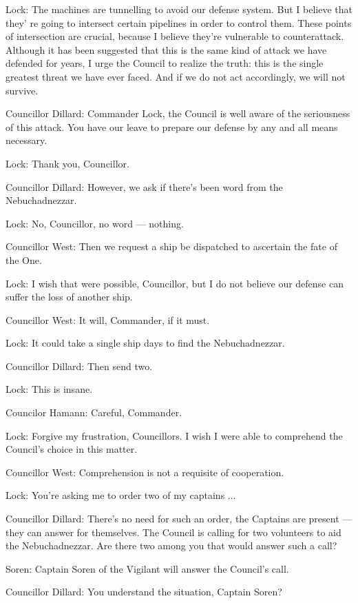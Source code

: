 \documentclass{ctexart}
\newenvironment{myquote}{\color{green} \setlength{\leftskip}{6em} \setlength{\rightskip}{4em} \setlength{\parindent}{-2em}}{\par}
\begin{document}
\begin{myquote}
Lock: The machines are tunnelling to avoid our defense system. But I believe that they' re going to intersect certain pipelines in order to control them. These points of intersection are crucial, because I believe they're vulnerable to counterattack. Although it has been suggested that this is the same kind of attack we have defended for years, I urge the Council to realize the truth: this is the single greatest threat we have ever faced. And if we do not act accordingly, we will not survive.

Councillor Dillard: Commander Lock, the Council is well aware of the seriousness of this attack. You have our leave to prepare our defense by any and all means necessary.

Lock: Thank you, Councillor.

Councillor Dillard: However, we ask if there's been word from the Nebuchadnezzar.

Lock: No, Councillor, no word --- nothing.

Councillor West: Then we request a ship be dispatched to ascertain the fate of the One.

Lock: I wish that were possible, Councillor, but I do not believe our defense can suffer the loss of another ship.

Councillor West: It will, Commander, if it must.

Lock: It could take a single ship days to find the Nebuchadnezzar.

Councillor Dillard: Then send two.

Lock: This is insane.

Councilor Hamann: Careful, Commander.

Lock: Forgive my frustration, Councillors. I wish I were able to comprehend the Council's choice in this matter.

Councillor West: Comprehension is not a requisite of cooperation.

Lock: You're asking me to order two of my captains ...

Councillor Dillard: There's no need for such an order, the Captains are present --- they can answer for themselves. The Council is calling for two volunteers to aid the Nebuchadnezzar. Are there two among you that would answer such a call?

Soren: Captain Soren of the Vigilant will answer the Council's call.

Councillor Dillard: You understand the situation, Captain Soren?


\end{myquote}
\end{document}
